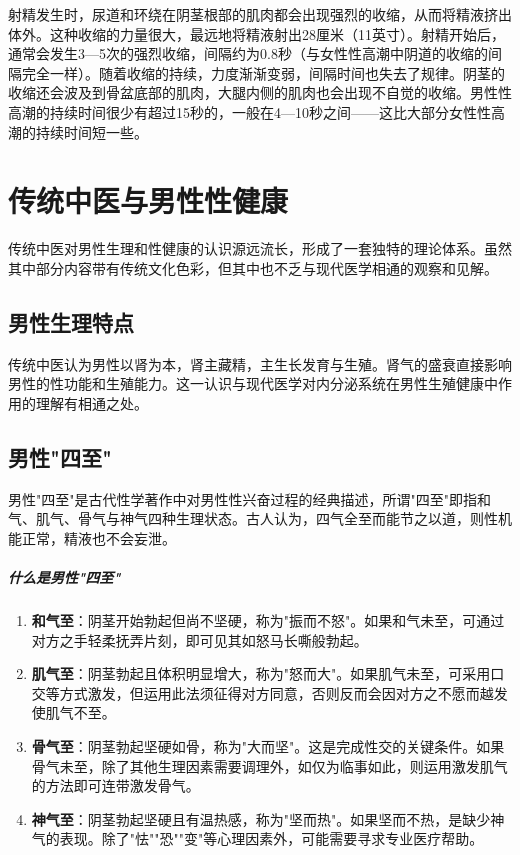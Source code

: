 射精发生时，尿道和环绕在阴茎根部的肌肉都会出现强烈的收缩，从而将精液挤出体外。这种收缩的力量很大，最远地将精液射出28厘米（11英寸）。射精开始后，通常会发生3—5次的强烈收缩，间隔约为0.8秒（与女性性高潮中阴道的收缩的间隔完全一样）。随着收缩的持续，力度渐渐变弱，间隔时间也失去了规律。阴茎的收缩还会波及到骨盆底部的肌肉，大腿内侧的肌肉也会出现不自觉的收缩。男性性高潮的持续时间很少有超过15秒的，一般在4—10秒之间——这比大部分女性性高潮的持续时间短一些。

\section{传统中医与男性性健康}

传统中医对男性生理和性健康的认识源远流长，形成了一套独特的理论体系。虽然其中部分内容带有传统文化色彩，但其中也不乏与现代医学相通的观察和见解。

\subsection{男性生理特点}

传统中医认为男性以肾为本，肾主藏精，主生长发育与生殖。肾气的盛衰直接影响男性的性功能和生殖能力。这一认识与现代医学对内分泌系统在男性生殖健康中作用的理解有相通之处。

\subsection{男性"四至"}

男性"四至"是古代性学著作中对男性性兴奋过程的经典描述，所谓"四至"即指和气、肌气、骨气与神气四种生理状态。古人认为，四气全至而能节之以道，则性机能正常，精液也不会妄泄。

\subparagraph{什么是男性"四至"}

\begin{enumerate}
    \item \textbf{和气至}：阴茎开始勃起但尚不坚硬，称为"振而不怒"。如果和气未至，可通过对方之手轻柔抚弄片刻，即可见其如怒马长嘶般勃起。
    
    \item \textbf{肌气至}：阴茎勃起且体积明显增大，称为"怒而大"。如果肌气未至，可采用口交等方式激发，但运用此法须征得对方同意，否则反而会因对方之不愿而越发使肌气不至。
    
    \item \textbf{骨气至}：阴茎勃起坚硬如骨，称为"大而坚"。这是完成性交的关键条件。如果骨气未至，除了其他生理因素需要调理外，如仅为临事如此，则运用激发肌气的方法即可连带激发骨气。
    
    \item \textbf{神气至}：阴茎勃起坚硬且有温热感，称为"坚而热"。如果坚而不热，是缺少神气的表现。除了"怯""恐""变"等心理因素外，可能需要寻求专业医疗帮助。
\end{enumerate}

